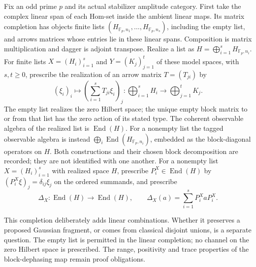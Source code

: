 \begin{definition}
Fix an odd prime $p$ and its actual stabilizer amplitude category.
First take the complex linear span of each Hom-set inside the ambient
linear maps. Its matrix completion has objects finite lists
$(H_{\mathbb F_p,n_1},\ldots,H_{\mathbb F_p,n_s})$, including the empty
list, and arrows matrices whose entries lie in these linear spans.
Composition is matrix multiplication and dagger is adjoint transpose.
Realize a list as $H=\bigoplus_{i=1}^sH_{\mathbb F_p,n_i}$.
For finite lists $X=(H_i)_{i=1}^s$ and $Y=(K_j)_{j=1}^t$ of these
model spaces, with $s,t\geq0$, prescribe the realization of an arrow
matrix $T=(T_{ji})$ by
\[
 (\xi_i)_i\longmapsto\left(\sum_{i=1}^sT_{ji}\xi_i\right)_j:
 \bigoplus_{i=1}^sH_i\longrightarrow\bigoplus_{j=1}^tK_j.
\]
The empty list realizes the zero Hilbert space; the unique empty block
matrix to or from that list has the zero action of its stated type.
The coherent observable algebra of the realized list is $\operatorname{End}(H)$.
For a nonempty list the tagged observable algebra is instead
$\bigoplus_i\operatorname{End}(H_{\mathbb F_p,n_i})$, embedded as the
block-diagonal operators on $H$. Both constructions and their chosen
block decomposition are recorded; they are not identified with one another.
For a nonempty list $X=(H_i)_{i=1}^s$ with realized space $H$, prescribe
$P_i^X\in\operatorname{End}(H)$ by
$(P_i^X\xi)_j=\delta_{ij}\xi_j$ on the ordered summands, and prescribe
\[
 \Delta_X:\operatorname{End}(H)\longrightarrow\operatorname{End}(H),
 \qquad \Delta_X(a)=\sum_{i=1}^sP_i^X aP_i^X.
\]
\end{definition}
\begin{scope}
This completion deliberately adds linear combinations. Whether it preserves a proposed Gaussian fragment, or comes from classical disjoint unions, is a separate question. The empty list is permitted in the linear completion; no channel on the zero Hilbert space is prescribed. The range, positivity and trace properties of the block-dephasing map remain proof obligations.
\end{scope}

